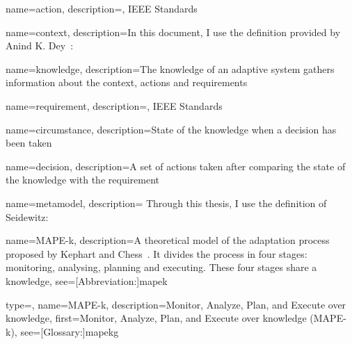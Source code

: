 {
	name={action},
	description={, IEEE Standards~\cite{iso2017systems}}
}

{
	name={context},
	description={In this document, I use the definition provided by Anind K. Dey~\cite{DBLP:journals/puc/Dey01}: }
}

{
	name={knowledge},
	description={The knowledge of an adaptive system gathers information about the \gls{context}, \glspl{action} and \glspl{requirement}}
}

{
	name={requirement},
	description={, IEEE Standards~\cite{iso2017systems}}
}

{
	name={circumstance},
	description={State of the \gls{knowledge} when a \gls{decision} has been taken}
}

{
	name={decision},
	description={A set of \glspl{action} taken after comparing the state of the \gls{knowledge} with the \gls{requirement}}
}

{
	name={metamodel},
	description={
Through this thesis, I use the definition of Seidewitz: ~\cite{DBLP:journals/software/Seidewitz03}
	}
}

{
	name={MAPE-k},
    description={A theoretical model of the adaptation process proposed by Kephart and Chess~\cite{DBLP:journals/computer/KephartC03}. It divides the process in four stages: monitoring, analysing, planning and executing. These four stages share a \gls{knowledge}},
    see=[Abbreviation:]{mapek}
}

{
	type=\acronymtype, 
	name={MAPE-k}, 
	description={Monitor, Analyze, Plan, and Execute over knowledge}, 
	first={Monitor, Analyze, Plan, and Execute over knowledge (MAPE-k)}, 
	see=[Glossary:]{mapekg}
}




